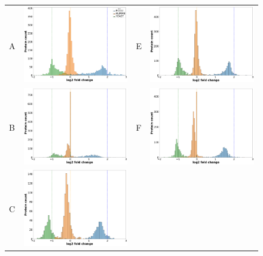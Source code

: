 \documentclass[10pt,letterpaper]{article}
\begin{document}
\begin{figure}[hbt]
    \centering
    \begin{tabular}{lclc} 
        A & \includegraphics[width=0.4\linewidth]{../../result/report_plots/osw_triqler_intensity.png} & 
        E & \includegraphics[width=0.4\linewidth]{../../result/report_plots/diann_triqler_intensity.png} \\ 
        B & \includegraphics[width=0.4\linewidth]{../../result/report_plots/osw_msqrobsum_intensity.png} & 
        F & \includegraphics[width=0.4\linewidth]{../../result/report_plots/diann_msqrobsum_intensity.png} \\ 
        C & \includegraphics[width=0.4\linewidth]{../../result/report_plots/osw_msstats_intensity.png} & 

\end{tabular}
\end{figure}
\end{document}
